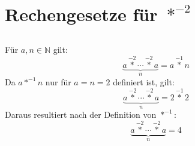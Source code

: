 \documentclass{article}
\begin{document}
\section{Rechengesetze f\"ur $\operatorname*{\ast}^{-2}$\newline}

\subsection{}
F\"ur $a, n \in \mathbb{N}$ gilt:
\[ \underbrace{a \operatorname*{\ast}^{-2} \dotsb \operatorname*{\ast}^{-2} a}_n = a\operatorname*{\ast}^{-1} n \]
Da $a\operatorname*{\ast}^{-1}n$ nur f\"ur $a=n=2$ definiert ist, gilt:
\[ \underbrace{a \operatorname*{\ast}^{-2} \dotsb \operatorname*{\ast}^{-2} a}_n = 2\operatorname*{\ast}^{-1}2 \]
Daraus resultiert nach der Definition von $\operatorname*{\ast}^{-1}$:
\[ \underbrace{a \operatorname*{\ast}^{-2} \dotsb \operatorname*{\ast}^{-2} a}_n = 4 \]
\end{document}
